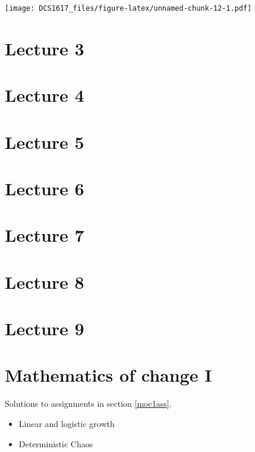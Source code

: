\documentclass[]{book}
\providecommand{\tightlist}{%
  \setlength{\itemsep}{0pt}\setlength{\parskip}{0pt}}
\begin{document}
\texttt{[image: DCS1617\_files/figure-latex/unnamed-chunk-12-1.pdf]}

\chapter*{Lecture 3}\label{lecture-3}

\chapter*{Lecture 4}\label{lecture-4}

\chapter*{Lecture 5}\label{lecture-5}

\chapter*{Lecture 6}\label{lecture-6}

\chapter*{Lecture 7}\label{lecture-7}

\chapter*{Lecture 8}\label{lecture-8}

\chapter*{Lecture 9}\label{lecture-9}

\appendix


\chapter{\texorpdfstring{\textbf{Mathematics of change
I}}{Mathematics of change I}}\label{mathematics-of-change-i}

Solutions to assignments in section \ref{moc1ass}.

\begin{itemize}
\tightlist
\item
  Linear and logistic growth
\item
  Deterministic Chaos
\end{itemize}
\end{document}

